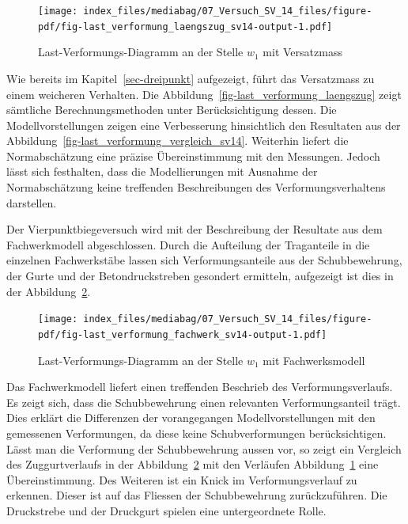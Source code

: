 \documentclass[
  12pt,
  letterpaper,
  egregdoesnotlikesansseriftitles]{scrreprt}
\begin{document}
\begin{figure}[H]

{\centering \texttt{[image: index\_files/mediabag/07\_Versuch\_SV\_14\_files/figure-pdf/fig-last\_verformung\_laengszug\_sv14-output-1.pdf]}

}

\caption{\label{fig-last_verformung_laengszug_sv14}Last-Verformungs-Diagramm
an der Stelle \(w_1\) mit Versatzmass}

\end{figure}

Wie bereits im Kapitel~\ref{sec-dreipunkt} aufgezeigt, führt das
Versatzmass zu einem weicheren Verhalten. Die
Abbildung~\ref{fig-last_verformung_laengszug} zeigt sämtliche
Berechnungsmethoden unter Berücksichtigung dessen. Die
Modellvorstellungen zeigen eine Verbesserung hinsichtlich den Resultaten
aus der Abbildung~\ref{fig-last_verformung_vergleich_sv14}. Weiterhin
liefert die Normabschätzung eine präzise Übereinstimmung mit den
Messungen. Jedoch lässt sich festhalten, dass die Modellierungen mit
Ausnahme der Normabschätzung keine treffenden Beschreibungen des
Verformungsverhaltens darstellen.

Der Vierpunktbiegeversuch wird mit der Beschreibung der Resultate aus
dem Fachwerkmodell abgeschlossen. Durch die Aufteilung der Traganteile
in die einzelnen Fachwerkstäbe lassen sich Verformungsanteile aus der
Schubbewehrung, der Gurte und der Betondruckstreben gesondert ermitteln,
aufgezeigt ist dies in der
Abbildung~\ref{fig-last_verformung_fachwerk_sv14}.

\begin{figure}[H]

{\centering \texttt{[image: index\_files/mediabag/07\_Versuch\_SV\_14\_files/figure-pdf/fig-last\_verformung\_fachwerk\_sv14-output-1.pdf]}

}

\caption{\label{fig-last_verformung_fachwerk_sv14}Last-Verformungs-Diagramm
an der Stelle \(w_1\) mit Fachwerksmodell}

\end{figure}

Das Fachwerkmodell liefert einen treffenden Beschrieb des
Verformungsverlaufs. Es zeigt sich, dass die Schubbewehrung einen
relevanten Verformungsanteil trägt. Dies erklärt die Differenzen der
vorangegangen Modellvorstellungen mit den gemessenen Verformungen, da
diese keine Schubverformungen berücksichtigen. Lässt man die Verformung
der Schubbewehrung aussen vor, so zeigt ein Vergleich des
Zuggurtverlaufs in der Abbildung~\ref{fig-last_verformung_fachwerk_sv14}
mit den Verläufen Abbildung~\ref{fig-last_verformung_laengszug_sv14}
eine Übereinstimmung. Des Weiteren ist ein Knick im Verformungsverlauf
zu erkennen. Dieser ist auf das Fliessen der Schubbewehrung
zurückzuführen. Die Druckstrebe und der Druckgurt spielen eine
untergeordnete Rolle.
\end{document}
